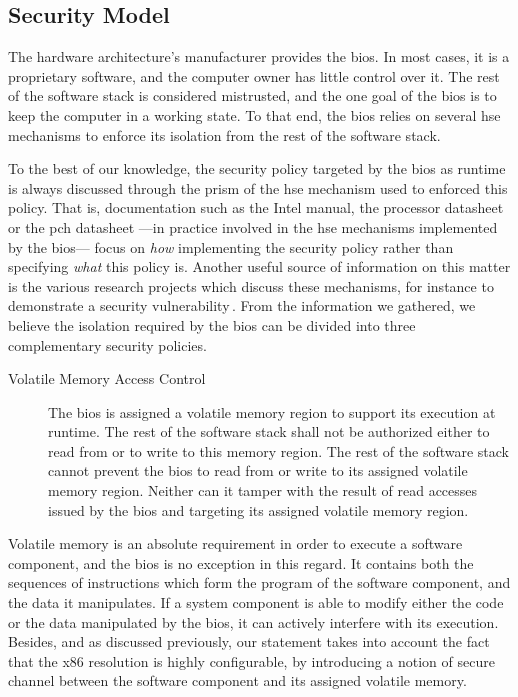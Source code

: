 \subsection{Security Model}
\label{subsec:usecase:firm:sec}

The hardware architecture’s manufacturer provides the \ac{bios}.
%
In most cases, it is a proprietary software, and the computer owner has little
control over it.
%
The rest of the software stack is considered mistrusted, and the one goal of the
\ac{bios} is to keep the computer in a working state.
%
To that end, the \ac{bios} relies on several \ac{hse} mechanisms to enforce its
isolation from the rest of the software stack.

To the best of our knowledge, the security policy targeted by the \ac{bios} as
runtime is always discussed through the prism of the \ac{hse} mechanism used to
enforced this policy.
%
That is, documentation such as the Intel manual, the processor datasheet or the
\ac{pch} datasheet ---in practice involved in the \ac{hse} mechanisms
implemented by the \ac{bios}--- focus on \emph{how} implementing the security
policy rather than specifying \emph{what} this policy is.
%
Another useful source of information on this matter is the various research
projects which discuss these mechanisms, for instance to demonstrate a
security
vulnerability\,\cite{duflot2009smram,wojtczuk2009smram,bulygin2014summary}.
%
From the information we gathered, we believe the isolation required by the
\ac{bios} can be divided into three complementary security policies.

\begin{description}
\item [Volatile Memory Access Control]
  The \ac{bios} is assigned a volatile memory region to support its execution at
  runtime.
  The rest of the software stack shall not be authorized either to read from
  or to write to this memory region.
  The rest of the software stack cannot prevent the \ac{bios} to read from or
  write to its assigned volatile memory region.
  Neither can it tamper with the
  result of read accesses issued by the \ac{bios} and targeting its assigned
  volatile memory region.
\end{description}
%
Volatile memory is an absolute requirement in order to execute a software
component, and the \ac{bios} is no exception in this regard.
%
It contains both the sequences of instructions which form the program of the
software component, and the data it manipulates.
%
If a system component is able to modify either the code or the data manipulated
by the \ac{bios}, it can actively interfere with its execution.
%
Besides, and as discussed previously, our statement takes into account the fact
that the x86 \IOs resolution is highly configurable, by introducing a notion of
secure channel  between the software component and its assigned
volatile memory.

